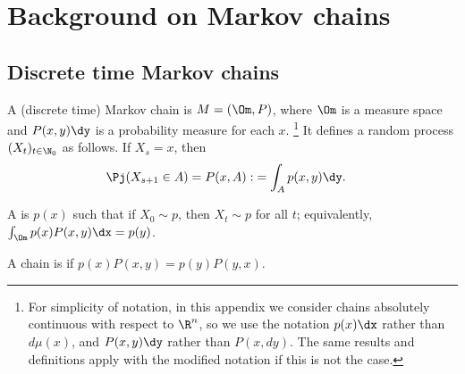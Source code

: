 \section{Background on Markov chains}
\label{a:markovchain}
\subsection{Discrete time Markov chains}


\begin{df}
A (discrete time) Markov chain is $M=(\Om,P)$, where $\Om$ is a measure space and $P(x,y)\dy$ is a probability measure for each $x$.
\footnote{For simplicity of notation, in this appendix we consider chains absolutely continuous with respect to $\R^n$, so we use the notation $p(x)\dx$ rather than $d\mu(x)$, and $P(x,y)\dy$ rather than $P(x,dy)$. The same results and definitions apply with the modified notation if this is not the case.}
It defines a random process $(X_t)_{t\in \N_0}$ as follows. If $X_s=x$, then 
\begin{align}
\Pj(X_{s+1}\in A) = P(x,A) :&=\int_A p(x,y)\dy. 
\end{align}

A  is $p(x)$ such that if $X_0\sim p$, then $X_t\sim p$ for all $t$; equivalently, $\int_\Om p(x) P(x,y) \dx = p(y)$. 

A chain is  if $p(x)P(x,y) = p(y) P(y,x)$. 
\end{df}


